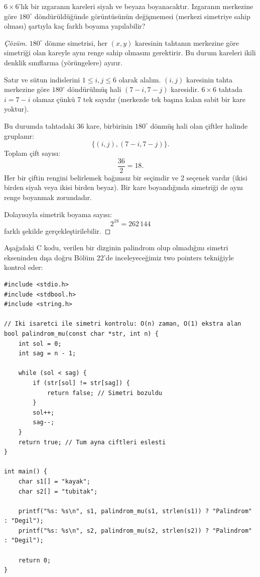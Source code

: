 \begin{example}
$6 \times 6$'lık bir ızgaranın kareleri siyah ve beyaza boyanacaktır. Izgaranın merkezine göre $180^\circ$ döndürüldüğünde görüntüsünün değişmemesi (merkezi simetriye sahip olması) şartıyla kaç farklı boyama yapılabilir?
\end{example}

\begin{proof}[Çözüm]
$180^\circ$ dönme simetrisi, her $(x, y)$ karesinin tahtanın merkezine göre simetriği olan kareyle aynı renge sahip olmasını gerektirir. Bu durum kareleri ikili denklik sınıflarına (yörüngelere) ayırır.

Satır ve sütun indislerini $1 \le i, j \le 6$ olarak alalım.
$(i, j)$ karesinin tahta merkezine göre $180^\circ$ döndürülmüş hali $(7 - i, 7 - j)$ karesidir.
$6 \times 6$ tahtada $i = 7 - i$ olamaz çünkü 7 tek sayıdır (merkezde tek başına kalan sabit bir kare yoktur).

Bu durumda tahtadaki 36 kare, birbirinin $180^\circ$ dönmüş hali olan çiftler halinde gruplanır:
\[
\{(i, j), (7 - i, 7 - j)\}.
\]
Toplam çift sayısı:
\[
\frac{36}{2} = 18.
\]
Her bir çiftin rengini belirlemek bağımsız bir seçimdir ve 2 seçenek vardır (ikisi birden siyah veya ikisi birden beyaz). Bir kare boyandığında simetriği de aynı renge boyanmak zorundadır.

Dolayısıyla simetrik boyama sayısı:
\[
2^{18} = 262\,144
\]
farklı şekilde gerçekleştirilebilir.
\end{proof}

Aşağıdaki C kodu, verilen bir dizginin palindrom olup olmadığını simetri ekseninden dışa doğru Bölüm 22'de inceleyeceğimiz two pointers tekniğiyle kontrol eder:

\begin{lstlisting}[language=CTemel]
#include <stdio.h>
#include <stdbool.h>
#include <string.h>

// Iki isaretci ile simetri kontrolu: O(n) zaman, O(1) ekstra alan
bool palindrom_mu(const char *str, int n) {
    int sol = 0;
    int sag = n - 1;
    
    while (sol < sag) {
        if (str[sol] != str[sag]) {
            return false; // Simetri bozuldu
        }
        sol++;
        sag--;
    }
    return true; // Tum ayna ciftleri eslesti
}

int main() {
    char s1[] = "kayak";
    char s2[] = "tubitak";
    
    printf("%s: %s\n", s1, palindrom_mu(s1, strlen(s1)) ? "Palindrom" : "Degil");
    printf("%s: %s\n", s2, palindrom_mu(s2, strlen(s2)) ? "Palindrom" : "Degil");
    
    return 0;
}
\end{lstlisting}

